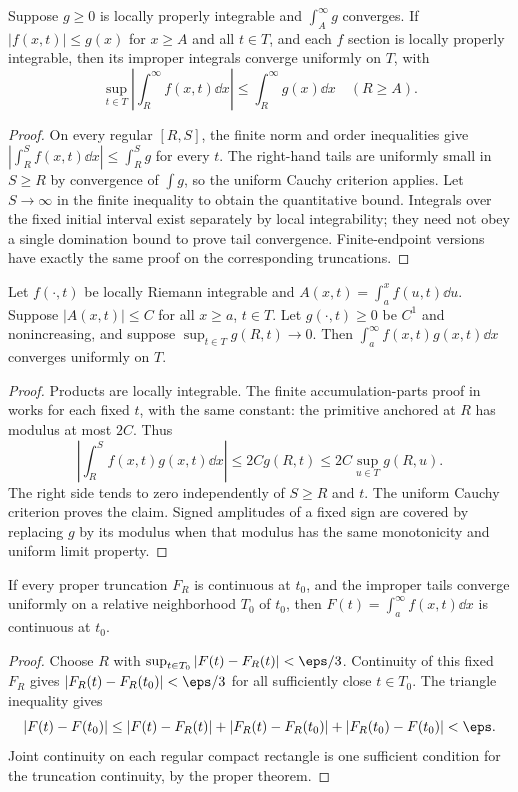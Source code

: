 \begin{theorem}
Suppose $g\ge0$ is locally properly integrable and $\int_A^\infty g$
converges. If $|f(x,t)|\le g(x)$ for $x\ge A$ and all $t\in T$,
and each $f$ section is locally properly integrable, then its improper
integrals converge uniformly on $T$, with
\[\sup_{t\in T}\left|\int_R^\infty f(x,t)\dd x\right|
\le\int_R^\infty g(x)\dd x\quad(R\ge A).
\]
\end{theorem}
\begin{proof}
On every regular $[R,S]$, the finite norm and order inequalities give
$|\int_R^Sf(x,t)\dd x|\le\int_R^Sg$ for every $t$.
The right-hand tails are uniformly small in $S\ge R$ by convergence
of $\int g$, so the uniform Cauchy criterion applies. Let $S\to\infty$
in the finite inequality to obtain the quantitative bound. Integrals
over the fixed initial interval exist separately by local integrability;
they need not obey a single domination bound to prove tail convergence.
Finite-endpoint versions have exactly the same proof on the corresponding
truncations.
\end{proof}

\begin{theorem}
Let $f(\cdot,t)$ be locally Riemann integrable and
$A(x,t)=\int_a^xf(u,t)\dd u$. Suppose $|A(x,t)|\le C$ for all
$x\ge a$, $t\in T$. Let $g(\cdot,t)\ge0$ be $C^1$ and
nonincreasing, and suppose $\sup_{t\in T}g(R,t)\to0$.
Then $\int_a^\infty f(x,t)g(x,t)\dd x$ converges uniformly on $T$.
\end{theorem}
\begin{proof}
Products are locally integrable. The finite accumulation-parts proof
in  works for each fixed $t$, with the same
constant: the primitive anchored at $R$ has modulus at most $2C$.
Thus
\[\left|\int_R^Sf(x,t)g(x,t)\dd x\right|
\le2C g(R,t)\le2C\sup_{u\in T}g(R,u).
\]
The right side tends to zero independently of $S\ge R$ and $t$.
The uniform Cauchy criterion proves the claim. Signed amplitudes of a
fixed sign are covered by replacing $g$ by its modulus when that modulus
has the same monotonicity and uniform limit property.
\end{proof}

\begin{theorem}
If every proper truncation $F_R$ is continuous at $t_0$, and the
improper tails converge uniformly on a relative neighborhood $T_0$
of $t_0$, then $F(t)=\int_a^\infty f(x,t)\dd x$ is continuous at $t_0$.
\end{theorem}
\begin{proof}
Choose $R$ with $\sup_{t\in T_0}|F(t)-F_R(t)|<\eps/3$.
Continuity of this fixed $F_R$ gives
$|F_R(t)-F_R(t_0)|<\eps/3$ for all sufficiently close $t\in T_0$.
The triangle inequality gives
\[|F(t)-F(t_0)|\le|F(t)-F_R(t)|+
|F_R(t)-F_R(t_0)|+|F_R(t_0)-F(t_0)|<\eps.
\]
Joint continuity on each regular compact rectangle is one sufficient
condition for the truncation continuity, by the proper theorem.
\end{proof}

